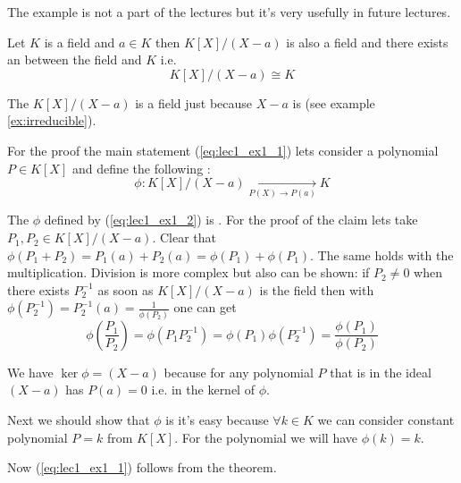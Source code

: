\begin{example}
  The example is not a part of the lectures but it's very usefully in
  future lectures.

  Let $K$ is a field and $a \in K$ then $K\left[X\right]/\left(X -
  a\right)$ is also a field and there exists an
   between the field and $K$ i.e.
  \begin{equation}
    K\left[X\right]/\left(X - a\right) \cong K
    \label{eq:lec1_ex1_1}
  \end{equation}

  The $K\left[X\right]/\left(X - a\right)$ is a field just because
  $X-a$ is
   (see example \ref{ex:irreducible}).

  For the proof the main statement (\ref{eq:lec1_ex1_1}) lets consider a
  polynomial $P \in  K\left[X\right]$ and 
  define the following :
  \begin{equation}
  \phi: K\left[X\right]/\left(X - a\right)
  \xrightarrow[P(X) \to P(a)]{} K
  \label{eq:lec1_ex1_2}
  \end{equation}

  The $\phi$ defined by (\ref{eq:lec1_ex1_2}) is
  . For the proof of the claim lets take
  $P_1, P_2 \in K\left[X\right]/\left(X - a\right)$. Clear that
  $\phi\left(P_1 + P_2\right) = P_1\left(a\right) + P_2\left(a\right)
  = \phi\left(P_1\right) + \phi\left(P_1\right)$. The same holds with
  the multiplication. Division is more complex but also can be
  shown: if $P_2 \ne 0$ when there exists $P_2^{-1}$ as soon as
  $K\left[X\right]/\left(X - a\right)$ is the field then
  with $\phi\left(P_2^{-1}\right) = P_2^{-1}\left(a\right) =
  \frac{1}{\phi\left(P_2\right)}$ one can get
  \[
  \phi\left(\frac{P_1}{P_2}\right) =
  \phi\left(P_1 P_2^{-1}\right) =
  \phi\left(P_1\right) \phi\left(P_2^{-1}\right) =
  \frac{\phi\left(P_1\right)}{\phi\left(P_2\right)}
  \]

  We have $\ker{\phi} = \left(X - a\right)$ because for any polynomial
  $P$ that is in the ideal $\left(X - a\right)$ has $P(a) = 0$ i.e. in
  the kernel of $\phi$.

  Next we should show that $\phi$ is  it's
  easy because $\forall k \in K$ we can consider constant polynomial
  $P = k$ from $K\left[X\right]$. For the polynomial we will have
  $\phi\left(k\right) = k$.

  Now (\ref{eq:lec1_ex1_1}) follows from the
   theorem. 
  
  \label{ex:lec1_fieldquotionisomorphism}
\end{example}

